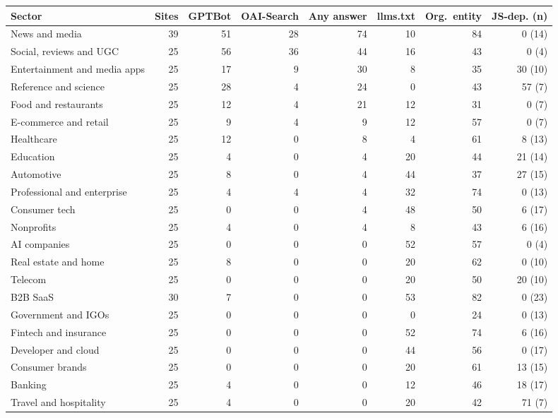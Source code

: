 \begin{tabular}{@{}lrrrrrrr@{}}
\toprule
Sector & Sites & GPTBot & OAI-Search & Any answer & llms.txt & Org.\ entity & JS-dep. (n) \\
\midrule
News and media & 39 & 51 & 28 & 74 & 10 & 84 & 0 (14) \\
Social, reviews and UGC & 25 & 56 & 36 & 44 & 16 & 43 & 0 (4) \\
Entertainment and media apps & 25 & 17 & 9 & 30 & 8 & 35 & 30 (10) \\
Reference and science & 25 & 28 & 4 & 24 & 0 & 43 & 57 (7) \\
Food and restaurants & 25 & 12 & 4 & 21 & 12 & 31 & 0 (7) \\
E-commerce and retail & 25 & 9 & 4 & 9 & 12 & 57 & 0 (7) \\
Healthcare & 25 & 12 & 0 & 8 & 4 & 61 & 8 (13) \\
Education & 25 & 4 & 0 & 4 & 20 & 44 & 21 (14) \\
Automotive & 25 & 8 & 0 & 4 & 44 & 37 & 27 (15) \\
Professional and enterprise & 25 & 4 & 4 & 4 & 32 & 74 & 0 (13) \\
Consumer tech & 25 & 0 & 0 & 4 & 48 & 50 & 6 (17) \\
Nonprofits & 25 & 4 & 0 & 4 & 8 & 43 & 6 (16) \\
AI companies & 25 & 0 & 0 & 0 & 52 & 57 & 0 (4) \\
Real estate and home & 25 & 8 & 0 & 0 & 20 & 62 & 0 (10) \\
Telecom & 25 & 0 & 0 & 0 & 20 & 50 & 20 (10) \\
B2B SaaS & 30 & 7 & 0 & 0 & 53 & 82 & 0 (23) \\
Government and IGOs & 25 & 0 & 0 & 0 & 0 & 24 & 0 (13) \\
Fintech and insurance & 25 & 0 & 0 & 0 & 52 & 74 & 6 (16) \\
Developer and cloud & 25 & 0 & 0 & 0 & 44 & 56 & 0 (17) \\
Consumer brands & 25 & 0 & 0 & 0 & 20 & 61 & 13 (15) \\
Banking & 25 & 4 & 0 & 0 & 12 & 46 & 18 (17) \\
Travel and hospitality & 25 & 4 & 0 & 0 & 20 & 42 & 71 (7) \\
\bottomrule
\end{tabular}
